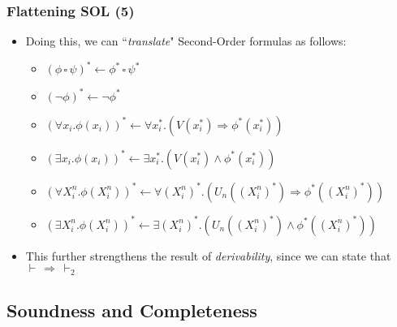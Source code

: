 \documentclass{beamer}
\begin{document}
                \begin{frame}
                    \frametitle{Flattening SOL (5)}
                    \begin{itemize}
                        \item Doing this, we can ``\textit{translate}" Second-Order formulas as follows:
                              \begin{itemize}
                                \item $ (\phi\, \square\, \psi)^* \leftarrow \phi^*\, \square\, \psi^* $
                                \item $ (\neg \phi)^* \leftarrow \neg \phi^* $
                                \item $ (\forall x_i. \phi(x_i))^* \leftarrow \forall x_i^*. (V(x_i^*) \Rightarrow \phi^*(x_i^*)) $
                                \item $ (\exists x_i. \phi(x_i))^* \leftarrow \exists x_i^*. (V(x_i^*) \wedge \phi^*(x_i^*)) $
                                \item $ (\forall X^n_i. \phi(X^n_i))^* \leftarrow \forall (X^n_i)^*. (U_n((X^n_i)^*) \Rightarrow \phi^*((X^n_i)^*)) $
                                \item $ (\exists X^n_i. \phi(X^n_i))^* \leftarrow \exists (X^n_i)^*. (U_n((X^n_i)^*) \wedge \phi^*((X^n_i)^*)) $
                              \end{itemize}
                        \item This further strengthens the result of \textit{derivability}, since we can state that $ \vdash\, \Rightarrow\, \vdash_2 $
                    \end{itemize}
                \end{frame}

            \subsection{Soundness and Completeness}
\end{document}
